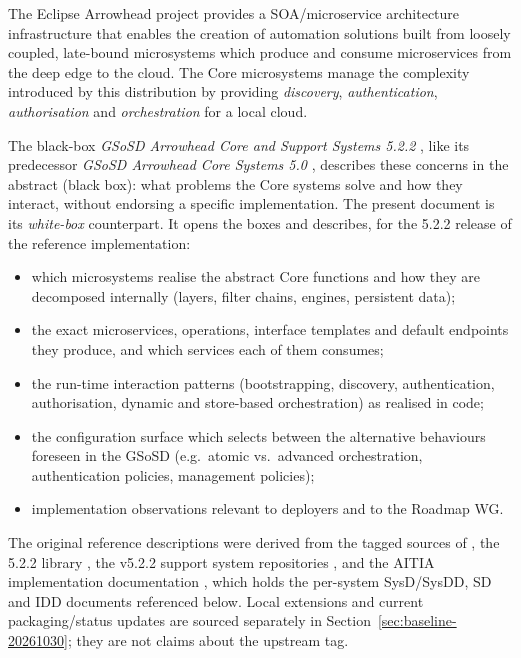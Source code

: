 \documentclass[a4paper]{arrowhead}
\begin{document}
The Eclipse Arrowhead project provides a SOA/microservice architecture infrastructure that
enables the creation of automation solutions built from loosely coupled, late-bound microsystems
which produce and consume microservices from the deep edge to the cloud. The Core microsystems
manage the complexity introduced by this distribution by providing \emph{discovery},
\emph{authentication}, \emph{authorisation} and \emph{orchestration} for a local cloud.

The black-box \emph{GSoSD Arrowhead Core and Support Systems 5.2.2} \cite{gsosd522}, like its
predecessor \emph{GSoSD Arrowhead Core Systems 5.0} \cite{gsosd50}, describes these concerns in the
abstract (black box): what problems the Core systems solve and how they interact, without
endorsing a specific implementation. The present document is its \emph{white-box} counterpart.
It opens the boxes and describes, for the 5.2.2 release of the reference implementation:

\begin{itemize}
  \item which microsystems realise the abstract Core functions and how they are decomposed
        internally (layers, filter chains, engines, persistent data);
  \item the exact microservices, operations, interface templates and default endpoints they
        produce, and which services each of them consumes;
  \item the run-time interaction patterns (bootstrapping, discovery, authentication,
        authorisation, dynamic and store-based orchestration) as realised in code;
  \item the configuration surface which selects between the alternative behaviours foreseen in
        the GSoSD (e.g.\ atomic vs.\ advanced orchestration, authentication policies,
        management policies);
  \item implementation observations relevant to deployers and to the Roadmap WG.
\end{itemize}

The original reference descriptions were derived from the tagged  sources of
 \cite{ah5core}, the 5.2.2  library
\cite{ah5common}, the v5.2.2 support system repositories
\cite{ah5blacklist,ah5translation,ah5qos}, and the AITIA implementation documentation
\cite{ah5docs}, which holds the per-system SysD/SysDD, SD and IDD documents referenced below.
Local extensions and current packaging/status updates are sourced separately
in Section~\ref{sec:baseline-20261030}; they are not claims about the upstream tag.
\end{document}
